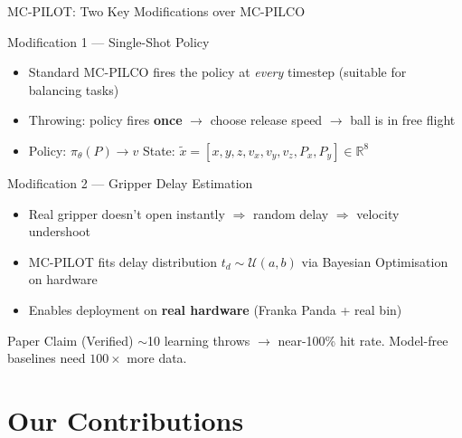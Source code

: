 \documentclass{if-beamer}
\begin{document}
\begin{frame}{MC-PILOT: Two Key Modifications over MC-PILCO}
    \begin{block}{Modification 1 --- Single-Shot Policy}
        \begin{itemize}
            \item Standard MC-PILCO fires the policy at \textit{every} timestep (suitable for balancing tasks)
            \item Throwing: policy fires \textbf{once} $\rightarrow$ choose release speed $\rightarrow$ ball is in free flight
            \item Policy: $\pi_\theta(P) \rightarrow v$ \quad State: $\tilde{x} = [x,y,z,v_x,v_y,v_z,P_x,P_y] \in \mathbb{R}^8$
        \end{itemize}
    \end{block}
    \begin{block}{Modification 2 --- Gripper Delay Estimation}
        \begin{itemize}
            \item Real gripper doesn't open instantly $\Rightarrow$ random delay $\Rightarrow$ velocity undershoot
            \item MC-PILOT fits delay distribution $t_d \sim \mathcal{U}(a,b)$ via Bayesian Optimisation on hardware
            \item Enables deployment on \textbf{real hardware} (Franka Panda + real bin)
        \end{itemize}
    \end{block}
    \begin{alertblock}{Paper Claim (Verified)}
        $\sim$10 learning throws $\rightarrow$ near-100\% hit rate. Model-free baselines need $100\times$ more data.
    \end{alertblock}
\end{frame}

\section{Our Contributions}
\end{document}
